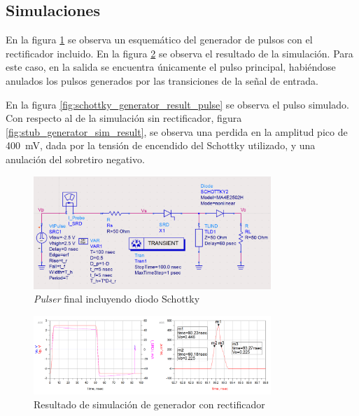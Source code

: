 \subsection{Simulaciones}

En la figura \ref{fig:pulser_w_schottky_sch} se observa un esquemático del
generador de pulsos con el rectificador incluido. En la figura
\ref{fig:pulser_w_schottky_sim_result} se observa el resultado de la
simulación. Para este caso, en la salida se encuentra únicamente el pulso
principal, habiéndose anulados los pulsos generados por las transiciones de la
señal de entrada.

En la figura \ref{fig:schottky_generator_result_pulse} se observa el pulso
simulado. Con respecto al de la simulación sin rectificador, figura
\ref{fig:stub_generator_sim_result}, se observa una perdida en la amplitud pico de
\qty{400}{\milli\volt}, dada por la tensión de encendido del Schottky
utilizado, y una anulación del sobretiro negativo.

\begin{figure}[tbp]
    \centering
    \includegraphics[width=0.8\textwidth]{images/pulser_w_schottky_sch.png}
    \caption{\textit{Pulser} final incluyendo diodo Schottky}
    \label{fig:pulser_w_schottky_sch}
\end{figure}

\begin{figure}[tbp]
    \centering
    \includegraphics[width=0.8\textwidth]{images/pulser_w_schottky_sim_result.png}
    \caption{Resultado de simulación de generador con rectificador}
    \label{fig:pulser_w_schottky_sim_result}
\end{figure}

